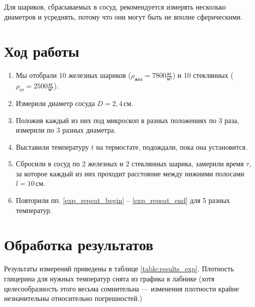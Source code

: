 \documentclass[12pt]{article}
\begin{document}
	Для шариков, сбрасываемых в сосуд, рекомендуется измерять несколько диаметров и усреднять, потому что они могут быть не вполне сферическими.
	
	\section*{Ход работы}
	
	\begin{enumerate}
	\item Мы отобрали 10 железных шариков ($\rho_\text{жел}=7800\frac{\text{кг}}{\text{м}^3}$) и 10 стеклянных ($\rho_\text{ст}=2500\frac{\text{кг}}{\text{м}^3}$).
	\item Измерили диаметр сосуда $D=2{,}4\,\text{см}$.
	\item Положив каждый из них под микроскоп в разных положениях по 3 раза, измерили по 3 разных диаметра.
	\item Выставили температуру $t$ на термостате, подождали, пока она установится. \label{exp_repeat_begin}
	\item Сбросили в сосуд по 2 железных и 2 стеклянных шарика, замерили время $\tau$, за которое каждый из них проходит расстояние между нижними полосами $l=10\,\text{см}$. \label{exp_repeat_end}
	\item Повторили пп. \ref{exp_repeat_begin} -- \ref{exp_repeat_end} для 5 разных температур.
	
	\end{enumerate}
	
	\section*{Обработка результатов}
	
	Результаты измерений приведены в таблице \ref{table:results_exp}. Плотность глицерина для нужных температур снята из графика в лабнике (хотя целесообразность этого весьма сомнительна --- изменения плотности крайне незначительны относительно погрешностей.)
	
\end{document}
